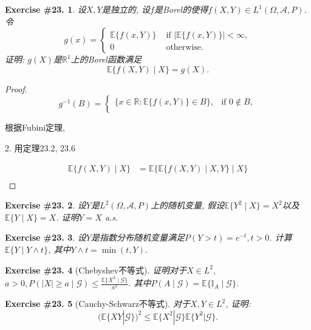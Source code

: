 \documentclass[UTF8, a4paper]{article}
\newtheorem{exercise}{Exercise \#23.}
\begin{document}
\begin{framed}
\begin{exercise}
设\(X, Y\)是独立的, 设\(f\)是Borel的使得\(f(X,Y) \in L^1(\Omega, \mathcal{A}, P)\).
令
$$g(x)=\left\{\begin{array}{cc}\mathbb{E}\{f(x,Y)\}&\text{ if }|\mathbb{E}\{f(x,Y)\}|<\infty,\\0&\text{ otherwise.}\end{array}\right.$$
证明: \(g(X)\)是\(\mathbb{R}^1\)上的Borel函数满足
$$
\mathbb{E}\{f(X, Y) \mid X\} = g(X).
$$
\end{exercise}
\end{framed}

\begin{proof}
$$
g^{-1}(B) = \begin{cases}
\{x \in \mathbb{R}: \mathbb{E}\{f(x, Y)\} \in B\}, & \text{if } 0 \not\in B, \\
\end{cases}
$$

根据Fubini定理, 


2. 用定理23.2, 23.6

$$
\begin{aligned}
\mathbb{E}\{f(X, Y) \mid X\} &= \mathbb{E}\{\mathbb{E}\{f(X, Y) \mid X, Y\} \mid X\} \\
\end{aligned}
$$
\end{proof}


\begin{exercise}
设\(Y\)是\(L^2(\Omega, \mathcal{A}, P)\)上的随机变量, 假设\(\mathbb{E}\{Y^2 \mid X\} = X^2\)以及\(\mathbb{E}\{Y \mid X\} = X\).
证明\(Y = X\) a.s.
\end{exercise}

\begin{exercise}
设\(Y\)是指数分布随机变量满足\(P(Y > t) = e^{-t}, t >0\).
计算\(\mathbb{E}\{Y \mid Y \wedge t\}\), 其中\(Y \wedge t = \min(t,Y)\).
\end{exercise}


\begin{exercise}[Chebyshev不等式]
证明对于\(X \in L^2\), \(a > 0, P(|X| \geq a \mid \mathcal{G}) \leq \frac{\mathbb{E}\{X^2 \mid \mathcal{G}\}}{a^2}\).
其中\(P(A\mid \mathcal{G}) = \mathbb{E}\{\mathbb{I}_A \mid \mathcal{G}\}\).
\end{exercise}


\begin{exercise}[Cauchy-Schwarz不等式]
对于\(X,Y \in L^2\), 证明: 
$$(\mathbb{E}\{XY|\mathcal{G}\})^2\leq \mathbb{E}\{X^2|\mathcal{G}\}\mathbb{E}\{Y^2|\mathcal{G}\}.$$
\end{exercise}
\end{document}
